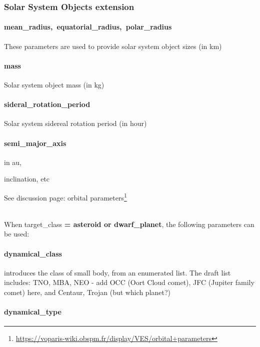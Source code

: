 \documentclass[11pt,a4paper]{ivoa}
\begin{document}
\subsubsection{Solar System Objects extension\\}

\paragraph{mean\_radius, equatorial\_radius, polar\_radius}

These parameters are used to provide solar system object sizes (in km)

\paragraph{mass}

Solar system object mass (in kg)

\paragraph{sideral\_rotation\_period}

Solar system sidereal rotation period (in hour)

\paragraph{semi\_major\_axis}

in au,

inclination, etc

See discussion page: orbital parameters\footnote{\url{https://voparis-wiki.obspm.fr/display/VES/orbital+parameters}}

\\

When target\_class\textbf{ = asteroid or dwarf\_planet}, the following parameters can be used:\textbf{\\}

\paragraph{dynamical\_class}

introduces the class of small body, from an enumerated list. The draft list includes: TNO, MBA, NEO - add OCC (Oort Cloud comet), JFC (Jupiter family comet) here, and Centaur, Trojan (but which planet?)

\paragraph{dynamical\_type}
\end{document}
